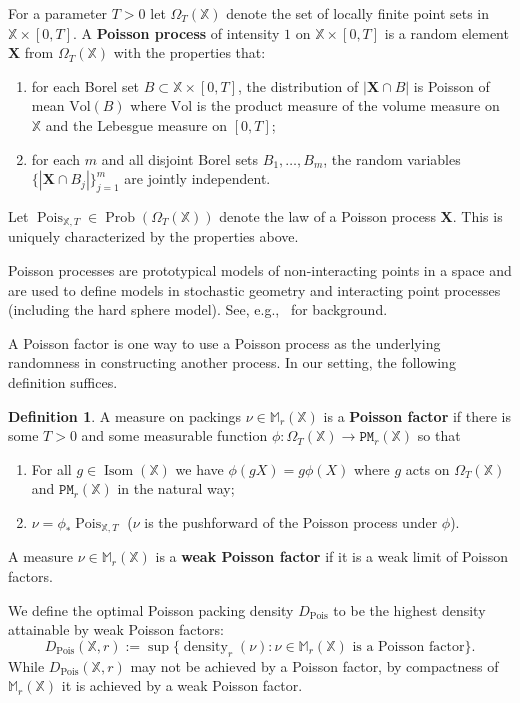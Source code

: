 \documentclass[11pt]{amsart}
\theoremstyle{definition}
\newtheorem{definition}[theorem]{Definition}
\theoremstyle{remark}
\newcommand{\M}{\mathbb{M}}
\newcommand{\bX}{\mathbb{X}}
\newcommand{\cP}{\mathtt{PM}}
\newcommand{\Isom}{\operatorname{Isom}}
\newcommand{\density}{\operatorname{density}}
\newcommand{\Pois}{\operatorname{Pois}}
\newcommand{\Prob}{\operatorname{Prob}}
\newcommand{\mes}{\mathrm{Vol}}
\begin{document}
For a parameter $T>0$ let $\Omega_T(\bX)$ denote the set of locally finite point sets in $\bX \times [0,T]$.  A {\bf Poisson process}  of intensity $1$ on $\bX \times [0,T]$ is a random element $\mathbf X$ from $\Omega_T(\bX)$ with the properties that:
\begin{enumerate}
    \item for each Borel set $B \subset \bX \times [0,T]$, the distribution of $|\mathbf{X} \cap B|$ is Poisson of mean $ \mes(B)$ where $\mes$ is the product measure of the volume measure on $\bX$ and the Lebesgue measure on $[0,T]$;
    \item for each $m$ and all disjoint Borel sets $B_1,\ldots,B_m$, the random variables $\{|\mathbf{X} \cap B_j|\}_{j = 1}^m$ are jointly independent.
\end{enumerate}
Let $\Pois_{\bX,T} \in \Prob(\Omega_T(\bX))$ denote the law of a Poisson process $\mathbf X$. This is uniquely characterized by the properties above.

Poisson processes  are prototypical models of non-interacting points in a space and are used to  define models in stochastic geometry and interacting point processes (including the hard sphere model). See, e.g.,~\cite{kingman1992poisson} for background.

A Poisson factor is one way to use a Poisson process as the underlying randomness in constructing another process.  In our setting, the following definition suffices.
\begin{definition}
   A measure on packings $\nu \in \M_r(\bX)$ is a {\bf Poisson factor} if there is some $T>0$ and some measurable function $\phi:\Omega_T(\bX)  \to \cP_r(\bX)$ so that
   \begin{enumerate}
       \item For all $g \in \Isom(\bX)$ we have $\phi(g X) = g \phi(X)$ where $g$ acts on $\Omega_T(\bX)$ and $\cP_r(\bX)$ in the natural way;
       \item $\nu = \phi_\ast \Pois_{\bX,T}$ ($\nu$ is the pushforward of the Poisson process under $\phi$).
   \end{enumerate}
    A measure $\nu \in \M_r(\bX)$ is a {\bf weak Poisson factor} if it is a weak limit of Poisson factors. 
\end{definition}






We define the optimal Poisson packing density $D_{\Pois}$ to be the highest density attainable by weak Poisson factors: 
\begin{equation}
    D_{\Pois}(\bX,r) := \sup\{\density_r(\nu) : \nu \in \M_r(\bX) \text{ is a Poisson factor}\}.
\end{equation}
While $D_{\Pois}(\bX,r)$ may not be achieved by a Poisson factor, by compactness of $\M_r(\bX)$ it is achieved by a weak Poisson factor.
\end{document}
